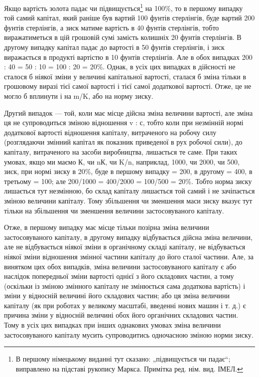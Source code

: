 \parcont{}  %
Якщо вартість золота падає чи підвищується\footnote*{
В першому німецькому виданні тут сказано: „підвищується чи падає“;
виправлено на підставі рукопису Маркса. Примітка ред. нім. вид. ІМЕЛ.
} на 100\%, то
в першому випадку той самий капітал, який раніше був вартий
100 фунтів стерлінгів, буде вартий 200 фунтів стерлінгів, а зиск
матиме вартість в 40 фунтів стерлінгів, тобто виражатиметься
в цій грошовій сумі замість колишніх 20 фунтів стерлінгів.
В другому випадку капітал падає до вартості в 50 фунтів
стерлінгів, і зиск виражається в продукті вартістю в 10 фунтів
стерлінгів. Але в обох випадках 200 : 40 = 50 : 10 = 100 : 20 = 20\%.
Однак, в усіх цих випадках в дійсності не сталося б ніякої
зміни у величині капітальної вартості, сталася б зміна тільки
в грошовому виразі тієї самої вартості і тієї самої додаткової
вартості. Отже, це не могло б вплинути і на m/K, або на норму
зиску.

Другий випадок — той, коли має місце дійсна зміна величини
вартості, але зміна ця не супроводиться зміною відношення
v : с, тобто коли при незмінній нормі додаткової вартості відношення
капіталу, витраченого на робочу силу (розглядаючи
змінний капітал як показник приведеної в рух робочої сили), до
капіталу, витраченого на засоби виробництва, лишається те
саме. При таких умовах, якщо ми маємо К, чи nК, чи K/n, наприклад,
1000, чи 2000, чи 500, зиск, при нормі зиску в 20\%,
буде в першому випадку = 200, в другому = 400, в третьому = 100;
але 200/1000 = 400/2000 = 100/500 = 20\%. Тобто норма зиску лишається тут
незмінною, бо склад капіталу лишається той самий і не зачіпається
зміною величини капіталу. Тому збільшення чи зменшення
маси зиску вказує тут тільки на збільшення чи зменшення
величини застосовуваного капіталу.

Отже, в першому випадку має місце тільки позірна зміна
величини застосовуваного капіталу, в другому випадку відбувається
дійсна зміна величини, але не відбувається ніякої зміни
в органічному складі капіталу, не відбувається ніякої зміни
відношення змінної частини капіталу до його сталої частини.
Але, за винятком цих обох випадків, зміна величини застосовуваного
капіталу є або наслідок попередньої зміни вартості
однієї з його складових частин, а тому (оскільки із зміною змінного
капіталу не змінюється сама додаткова вартість) і зміни
у відносній величині його складових частин; або ця зміна величини
капіталу (як при роботах у великому масштабі, введенні нових
машин і т. д.) є причина зміни у відносній величині обох його
органічних складових частин. Тому в усіх цих випадках при
інших однакових умовах зміна величини застосовуваного капіталу
мусить супроводитись одночасною зміною норми зиску.
